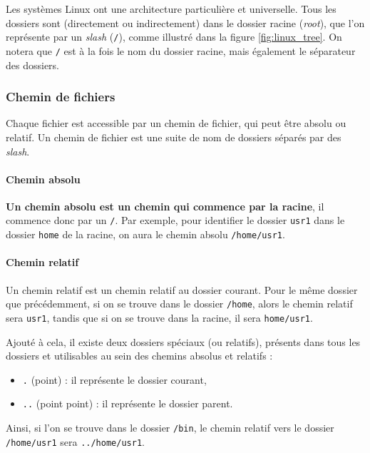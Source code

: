 Les systèmes Linux ont une architecture particulière et universelle. Tous les dossiers sont (directement ou indirectement) dans le dossier racine (\textit{root}), que l'on représente par un \textit{slash} (\texttt{/}), comme illustré dans la figure \ref{fig:linux_tree}. On notera que \texttt{/} est à la fois le nom du dossier racine, mais également le séparateur des dossiers.

\subsubsection{Chemin de fichiers}

Chaque fichier est accessible par un chemin de fichier, qui peut être absolu ou relatif. Un chemin de fichier est une suite de nom de dossiers séparés par des \textit{slash}.

\paragraph{Chemin absolu}

\textbf{Un chemin absolu est un chemin qui commence par la racine}, il commence donc par un \texttt{/}. Par exemple, pour identifier le dossier \texttt{usr1} dans le dossier \texttt{home} de la racine, on aura le chemin absolu \texttt{/home/usr1}.

\paragraph{Chemin relatif}

Un chemin relatif est un chemin relatif au dossier courant. Pour le même dossier que précédemment, si on se trouve dans le dossier \texttt{/home}, alors le chemin relatif sera \texttt{usr1}, tandis que si on se trouve dans la racine, il sera \texttt{home/usr1}.

Ajouté à cela, il existe deux dossiers spéciaux (ou relatifs), présents dans tous les dossiers et utilisables au sein des chemins absolus et relatifs : 
\begin{itemize}
    \item \texttt{.} (point) : il représente le dossier courant,
    \item \texttt{..} (point point) : il représente le dossier parent.
\end{itemize}

Ainsi, si l'on se trouve dans le dossier \texttt{/bin}, le chemin relatif vers le dossier \texttt{/home/usr1} sera \texttt{../home/usr1}.


